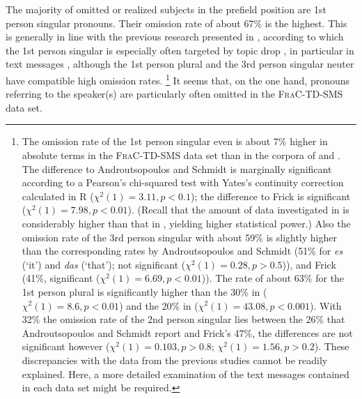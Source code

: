 The majority of omitted or realized subjects in the prefield position are 1st person singular pronouns.
Their omission rate of about 67\% is the highest.
This is generally in line with the previous research presented in , according to which the 1st person singular is especially often targeted by topic drop \citep{auer1993}, in particular in text messages \citep{androutsopoulos.schmidt2002,doring2002,frick2017}, although the 1st person plural and the 3rd person singular neuter have compatible high omission rates.%
\footnote{The omission rate of the 1st person singular even is about 7\% higher in absolute terms in the \textsc{FraC-TD-SMS} data set than in the corpora of \citet{androutsopoulos.schmidt2002} and \citet{frick2017}.
The difference to Androutsopoulos and Schmidt is marginally significant according to a Pearson's chi-squared test with Yates's continuity correction calculated in R \citep{rcoreteam2021} ($\chi^2(1) = 3.11, p < 0.1$); the difference to Frick is significant ($\chi^2(1) = 7.98, p < 0.01$). 
(Recall that the amount of data investigated in \cite{frick2017} is considerably higher than that in \cite{androutsopoulos.schmidt2002}, yielding higher statistical power.)
Also the omission rate of the 3rd person singular with about 59\% is slightly higher than the corresponding rates by Androutsopoulos and Schmidt (51\% for \textit{es} (`it') and \textit{das} (`that'); not significant ($\chi^2(1) = 0.28, p > 0.5$)), and Frick (41\%, significant ($\chi^2(1) = 6.69, p < 0.01$)).
The rate of about 63\% for the 1st person plural is significantly higher than the 30\% in \citet{androutsopoulos.schmidt2002} ($\chi^2(1) = 8.6, p < 0.01$) and the 20\% in \citet{frick2017} ($\chi^2(1) = 43.08, p < 0.001$).
With 32\% the omission rate of the 2nd person singular lies between the 26\% that Androutsopoulos and Schmidt report and Frick's 47\%, the differences are not significant however ($\chi^2(1) = 0.103, p > 0.8$; $\chi^2(1) = 1.56, p > 0.2$).
These discrepancies with the data from the previous studies cannot be readily explained.
Here, a more detailed examination of the text messages contained in each data set might be required.}
%
It seems that, on the one hand, pronouns referring to the speaker(s) are particularly often omitted in the \textsc{FraC-TD-SMS} data set.

